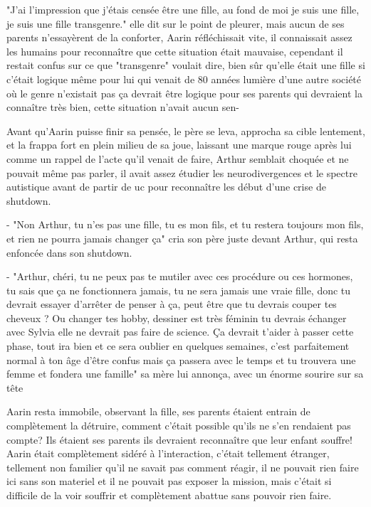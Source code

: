 \documentclass[12pt,hidelinks,a4paper]{book}
\begin{document}
"J'ai l'impression que j'étais censée être une fille, au fond de moi je suis une fille, je suis une fille transgenre." elle dit sur le 
point de pleurer, mais aucun de ses parents n'essayèrent de la conforter, Aarin réfléchissait vite, il connaissait assez 
les humains pour reconnaître que cette situation était mauvaise, cependant il restait confus sur ce que "transgenre" voulait 
dire, bien sûr qu'elle était une fille si c'était logique même pour lui qui venait de 80 années lumière d'une autre société 
où le genre n'existait pas ça devrait être logique pour ses parents qui devraient la connaître très bien, cette situation 
n'avait aucun sen-\par 
\bigskip

Avant qu'Aarin puisse finir sa pensée, le père se leva, approcha sa cible lentement, et la frappa fort en plein milieu de 
sa joue, laissant une marque rouge après lui comme un rappel de l'acte qu'il venait de faire, Arthur semblait choquée et 
ne pouvait même pas parler, il avait assez étudier les neurodivergences et le spectre autistique avant de partir de \gls{uc} 
pour reconnaître les début d'une crise de shutdown.\par 
\bigskip 

- "Non Arthur, tu n'es pas une fille, tu es mon fils, et tu restera toujours mon fils, et rien ne pourra 
jamais changer ça" cria son père juste devant Arthur, qui resta enfoncée dans son shutdown.\par 
- "Arthur, chéri, tu ne peux pas te mutiler avec ces procédure ou ces hormones, tu sais que ça ne fonctionnera 
jamais, tu ne sera jamais une vraie fille, donc tu devrait essayer d'arrêter de penser à ça, peut être que tu 
devrais couper tes cheveux ? Ou changer tes hobby, dessiner est très féminin tu devrais échanger avec Sylvia elle ne 
devrait pas faire de science. Ça devrait t'aider à passer cette phase, tout ira bien et ce sera oublier en quelques semaines,
c'est parfaitement normal à ton âge d'être confus mais ça passera avec le temps et tu trouvera une femme et fondera une famille"
sa mère lui annonça, avec un énorme sourire sur sa tête \par 
\bigskip

Aarin resta immobile, observant la fille, ses parents étaient entrain de complètement la détruire, comment c'était possible 
qu'ils ne s'en rendaient pas compte? Ils étaient ses parents ils devraient reconnaître que leur enfant souffre! Aarin était 
complètement sidéré à l'interaction, c'était tellement étranger, tellement non familier qu'il ne savait pas comment réagir,
il ne pouvait rien faire ici sans son materiel et il ne pouvait pas exposer la mission, mais c'était si difficile de la voir 
souffrir et complètement abattue sans pouvoir rien faire.\par 
\bigskip
\end{document}
